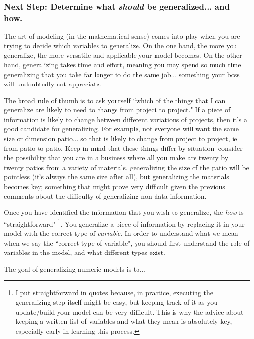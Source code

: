 \documentclass{ximera}
\begin{document}
\subsubsection*{Next Step: Determine what \emph{should} be generalized... and how.}

    The art of modeling (in the mathematical sense) comes into play when you are trying to decide which variables to generalize. On the one hand, the more you generalize, the more versatile and applicable your model becomes. On the other hand, generalizing takes time and effort, meaning you may spend so much time generalizing that you take far longer to do the same job... something your boss will undoubtedly not appreciate.
    
    The broad rule of thumb is to ask yourself ``which of the things that I can generalize are likely to need to change from project to project." If a piece of information is likely to change between different variations of projects, then it's a good candidate for generalizing. For example, not everyone will want the same size or dimension patio... so that is likely to change from project to project, ie from patio to patio. Keep in mind that these things differ by situation; consider the possibility that you are in a business where all you make are twenty by twenty patios from a variety of materials, generalizing the size of the patio will be pointless (it's always the same size after all), but generalizing the materials becomes key; something that might prove very difficult given the previous comments about the difficulty of generalizing non-data information.
    
    Once you have identified the information that you wish to generalize, the \textit{how} is ``straightforward"
    \footnote{I put straightforward in quotes because, in practice, executing the generalizing step itself might be easy, but keeping track of it as you update/build your model can be very difficult. This is why the advice about keeping a written list of variables and what they mean is absolutely key, especially early in learning this process.}.
    You generalize a piece of information by replacing it in your model with the correct type of \textit{variable}.
    In order to understand what we mean when we say the ``correct type of variable", you should first understand the role of variables in the model, and what different types exist.
    
    
    \begin{question}
        The goal of generalizing numeric models is to...
        \begin{selectAll}
        \end{selectAll}
    \end{question}
\end{document}

